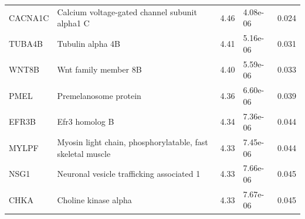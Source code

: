 \documentclass[10pt]{article}
\begin{document}
\begin{table}[]
\begin{tabular}{p{1.5cm}p{8cm}C{1cm}C{1.3cm}C{1.7cm}}
CACNA1C  & Calcium voltage-gated channel subunit alpha1 C             & 4.46          & 4.08e-06      & 0.024          \\
TUBA4B   & Tubulin alpha 4B                                           & 4.41          & 5.16e-06      & 0.031          \\
WNT8B    & Wnt family member 8B                                       & 4.40          & 5.59e-06      & 0.033          \\
PMEL     & Premelanosome protein                                      & 4.36          & 6.60e-06      & 0.039          \\
EFR3B    & Efr3 homolog B                                             & 4.34          & 7.36e-06      & 0.044          \\
MYLPF    & Myosin light chain, phosphorylatable, fast skeletal muscle & 4.33          & 7.45e-06      & 0.044          \\
NSG1     & Neuronal vesicle trafficking associated 1                  & 4.33          & 7.66e-06      & 0.045          \\
CHKA     & Choline kinase alpha                                       & 4.33          & 7.67e-06      & 0.045          \\

\end{tabular}
\end{table}
\end{document}
